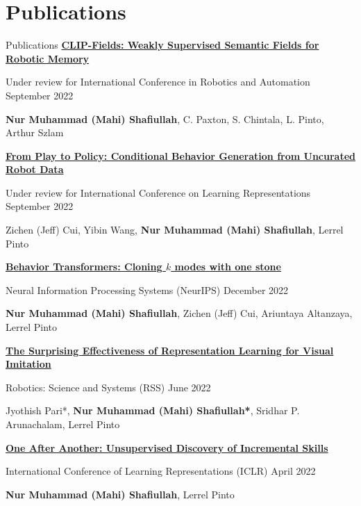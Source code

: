 \section{Publications}
{Publications}
\href{https://mahis.life/clip-fields/}
{\textbf{CLIP-Fields: Weakly Supervised Semantic Fields for Robotic Memory}}
\par 
{Under review for International Conference in Robotics and Automation} \hfill{September 2022}
\par 
{\textbf{Nur Muhammad (Mahi) Shafiullah}, C. Paxton, S. Chintala, L. Pinto, Arthur Szlam}

\EntryGap
\href{https://play-to-policy.github.io/}
{\textbf{From Play to Policy: Conditional Behavior Generation from Uncurated Robot Data}}
\par 
{Under review for International Conference  on Learning Representations} \hfill{September 2022}
\par 
{Zichen (Jeff) Cui, Yibin Wang, \textbf{Nur Muhammad (Mahi) Shafiullah}, Lerrel Pinto}

\EntryGap


\href{https://arxiv.org/abs/2206.11251}
{\textbf{Behavior Transformers: Cloning $k$ modes with one stone}}
\par 
{Neural Information Processing Systems (NeurIPS)} \hfill{December 2022}
\par 
{\textbf{Nur Muhammad (Mahi) Shafiullah}, Zichen (Jeff) Cui, Ariuntaya Altanzaya, Lerrel Pinto}

\EntryGap
\href{https://arxiv.org/abs/2112.01511}
{\textbf{The Surprising Effectiveness of Representation Learning for Visual Imitation}}
\par 
{Robotics: Science and Systems (RSS)} \hfill{June 2022}
\par 
{Jyothish Pari*, \textbf{Nur Muhammad (Mahi) Shafiullah*}, Sridhar P. Arunachalam, Lerrel Pinto}

\EntryGap
\href{https://openreview.net/forum?id=dg79moSRqIo}
{\textbf{One After Another: Unsupervised Discovery of Incremental Skills}}
\par 
{International Conference of Learning Representations (ICLR)} \hfill{April 2022}
\par 
{\textbf{Nur Muhammad (Mahi) Shafiullah}, Lerrel Pinto}


